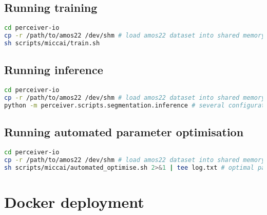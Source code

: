 \subsection{Running training}

\begin{lstlisting}[language=bash]
cd perceiver-io
cp -r /path/to/amos22 /dev/shm # load amos22 dataset into shared memory. not all data must be loaded to memory, only, imagesTr_preprocessed/* labelsTr_preprocessed/*, dataset.json, and several empty folders: [imagesTr, imagesVa, imagesVa_preprocessed, labelsTr, labelsVa, labelsVa_preprocessed]
sh scripts/miccai/train.sh
\end{lstlisting}

\subsection{Running inference}

\begin{lstlisting}[language=bash]
cd perceiver-io
cp -r /path/to/amos22 /dev/shm # load amos22 dataset into shared memory. not all data must be loaded to memory, only, imagesTr_preprocessed/* labelsTr_preprocessed/*, dataset.json, and several empty folders: [imagesTr, imagesVa, imagesVa_preprocessed, labelsTr, labelsVa, labelsVa_preprocessed] This obviously depends on what dataset split is to be inferenced
python -m perceiver.scripts.segmentation.inference # several configuration parameters can be changed in the GLOBALS at the start of the corresponding file
\end{lstlisting}

\subsection{Running automated parameter optimisation}

\begin{lstlisting}[language=bash]
cd perceiver-io
cp -r /path/to/amos22 /dev/shm # load amos22 dataset into shared memory. not all data must be loaded to memory, only, imagesTr_preprocessed/* labelsTr_preprocessed/*, dataset.json, and several empty folders: [imagesTr, imagesVa, imagesVa_preprocessed, labelsTr, labelsVa, labelsVa_preprocessed]
sh scripts/miccai/automated_optimise.sh 2>&1 | tee log.txt # optimal parameters will be printed to the console, hence recommending using the use of tee
\end{lstlisting}

\section{Docker deployment}

